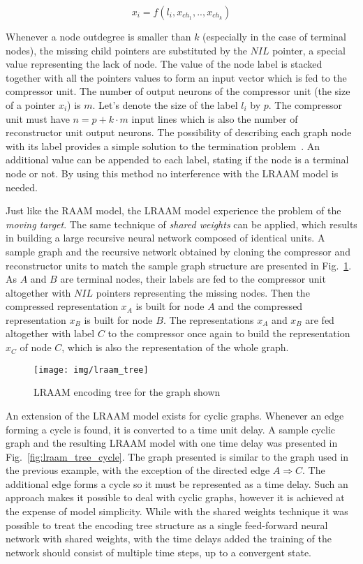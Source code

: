 \begin{equation}
x_i = f(l_i, x_{ch_1}, .., x_{ch_k})
\label{eq:lraam_pointer}
\end{equation}

Whenever a node outdegree is smaller than $k$ (especially in the case of terminal nodes), the missing child pointers are substituted by the $NIL$ pointer, a special value representing the lack of node. The value of the node label is stacked together with all the pointers values to form an input vector which is fed to the compressor unit. The number of output neurons of the compressor unit (the size of a pointer $x_i$) is $m$. Let's denote the size of the label $l_i$ by $p$. The compressor unit must have $n = p + k \cdot m$ input lines which is also the number of reconstructor unit output neurons. The possibility of describing each graph node with its label provides a simple solution to the termination problem~\cite{sperduti1994labelling}. An additional value can be appended to each label, stating if the node is a terminal node or not. By using this method no interference with the LRAAM model is needed.

Just like the RAAM model, the LRAAM model experience the problem of the \emph{moving target}. The same technique of \emph{shared weights} can be applied, which results in building a large recursive neural network composed of identical units. A sample graph and the recursive network obtained by cloning the compressor and reconstructor units to match the sample graph structure are presented in Fig.~\ref{fig:lraam_tree}. As $A$ and $B$ are terminal nodes, their labels are fed to the compressor unit altogether with $NIL$ pointers representing the missing nodes. Then the compressed representation $x_{A}$ is built for node $A$ and the compressed representation $x_{B}$ is built for node $B$. The representations $x_A$ and $x_B$ are fed altogether with label $C$ to the compressor once again to build the representation $x_C$ of node $C$, which is also the representation of the whole graph.

\begin{figure}
\begin{center}
	\texttt{[image: img/lraam\_tree]}
	\caption{LRAAM encoding tree for the graph shown}
	\label{fig:lraam_tree}
\end{center}
\end{figure}

An extension of the LRAAM model exists for cyclic graphs. Whenever an edge forming a cycle is found, it is converted to a time unit delay. A sample cyclic graph and the resulting LRAAM model with one time delay was presented in Fig.~\ref{fig:lraam_tree_cycle}. The graph presented is similar to the graph used in the previous example, with the exception of the directed edge $A \Rightarrow C$. The additional edge forms a cycle so it must be represented as a time delay. Such an approach makes it possible to deal with cyclic graphs, however it is achieved at the expense of model simplicity. While with the shared weights technique it was possible to treat the encoding tree structure as a single feed-forward neural network with shared weights, with the time delays added the training of the network should consist of multiple time steps, up to a convergent state.

